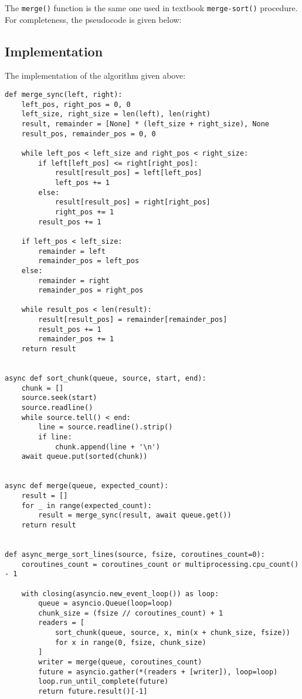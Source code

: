 \documentclass[11pt]{article}
\begin{document}
The \verb~merge()~ function is the same one used in textbook \verb~merge-sort()~
procedure.  For completeness, the pseudocode is given below:

\subsection{Implementation}
\label{sec-2-2}
The implementation of the algorithm given above:

\lstset{language=Python,label= ,caption= ,numbers=none}
\begin{lstlisting}
def merge_sync(left, right):
    left_pos, right_pos = 0, 0
    left_size, right_size = len(left), len(right)
    result, remainder = [None] * (left_size + right_size), None
    result_pos, remainder_pos = 0, 0

    while left_pos < left_size and right_pos < right_size:
        if left[left_pos] <= right[right_pos]:
            result[result_pos] = left[left_pos]
            left_pos += 1
        else:
            result[result_pos] = right[right_pos]
            right_pos += 1
        result_pos += 1

    if left_pos < left_size:
        remainder = left
        remainder_pos = left_pos
    else:
        remainder = right
        remainder_pos = right_pos

    while result_pos < len(result):
        result[result_pos] = remainder[remainder_pos]
        result_pos += 1
        remainder_pos += 1
    return result


async def sort_chunk(queue, source, start, end):
    chunk = []
    source.seek(start)
    source.readline()
    while source.tell() < end:
        line = source.readline().strip()
        if line:
            chunk.append(line + '\n')
    await queue.put(sorted(chunk))


async def merge(queue, expected_count):
    result = []
    for _ in range(expected_count):
        result = merge_sync(result, await queue.get())
    return result


def async_merge_sort_lines(source, fsize, coroutines_count=0):
    coroutines_count = coroutines_count or multiprocessing.cpu_count() - 1

    with closing(asyncio.new_event_loop()) as loop:
        queue = asyncio.Queue(loop=loop)
        chunk_size = (fsize // coroutines_count) + 1
        readers = [
            sort_chunk(queue, source, x, min(x + chunk_size, fsize))
            for x in range(0, fsize, chunk_size)
        ]
        writer = merge(queue, coroutines_count)
        future = asyncio.gather(*(readers + [writer]), loop=loop)
        loop.run_until_complete(future)
        return future.result()[-1]
\end{lstlisting}
\end{document}

